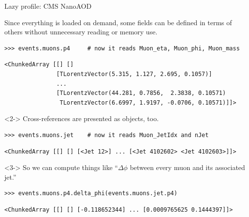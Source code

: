 \documentclass[aspectratio=169]{beamer}
\begin{document}
\begin{frame}[fragile]{Lazy profile: CMS NanoAOD}
\large
\vspace{0.3 cm}

Since everything is loaded on demand, some fields can be defined in terms of others without unnecessary reading or memory use.

\small
\begin{verbatim}
>>> events.muons.p4     # now it reads Muon_eta, Muon_phi, Muon_mass
\end{verbatim}

\vspace{-0.4 cm}
\color{darkblue}\begin{verbatim}
<ChunkedArray [[] []
               [TLorentzVector(5.315, 1.127, 2.695, 0.1057)]
               ...
               [TLorentzVector(44.281, 0.7856,  2.3838, 0.10571)
                TLorentzVector(6.6997, 1.9197, -0.0706, 0.10571)]]>
\end{verbatim}
\color{black}\large

\begin{uncoverenv}<2->
Cross-references are presented as objects, too.

\small
\begin{verbatim}
>>> events.muons.jet    # now it reads Muon_JetIdx and nJet
\end{verbatim}

\vspace{-0.3 cm}
\color{darkblue}\begin{verbatim}
<ChunkedArray [[] [] [<Jet 12>] ... [<Jet 4102602> <Jet 4102603>]]>
\end{verbatim}
\color{black}\large
\end{uncoverenv}

\begin{uncoverenv}<3->
So we can compute things like ``$\Delta \phi$ between every muon and its associated jet.''

\small
\begin{verbatim}
>>> events.muons.p4.delta_phi(events.muons.jet.p4)
\end{verbatim}

\vspace{-0.3 cm}
\color{darkblue}\begin{verbatim}
<ChunkedArray [[] [] [-0.118652344] ... [0.0009765625 0.1444397]]>
\end{verbatim}
\color{black}
\end{uncoverenv}
\end{frame}
\end{document}
